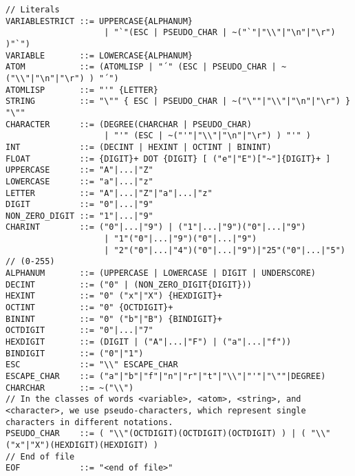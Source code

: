\begin{lstlisting}[label={lst:newOzLexical},language=ebnf]
// Literals
VARIABLESTRICT ::= UPPERCASE{ALPHANUM}
                    | "`"(ESC | PSEUDO_CHAR | ~("`"|"\\"|"\n"|"\r") )"`")
VARIABLE       ::= LOWERCASE{ALPHANUM}
ATOM           ::= (ATOMLISP | "´" (ESC | PSEUDO_CHAR | ~("\\"|"\n"|"\r") ) "´")
ATOMLISP       ::= "'" {LETTER}
STRING         ::= "\"" { ESC | PSEUDO_CHAR | ~("\""|"\\"|"\n"|"\r") } "\""
CHARACTER      ::= (DEGREE(CHARCHAR | PSEUDO_CHAR)
                    | "'" (ESC | ~("'"|"\\"|"\n"|"\r") ) "'" )
INT            ::= (DECINT | HEXINT | OCTINT | BININT)
FLOAT          ::= {DIGIT}+ DOT {DIGIT} [ ("e"|"E")["~"]{DIGIT}+ ]
UPPERCASE      ::= "A"|...|"Z"
LOWERCASE      ::= "a"|...|"z"
LETTER         ::= "A"|...|"Z"|"a"|...|"z"
DIGIT          ::= "0"|...|"9"
NON_ZERO_DIGIT ::= "1"|...|"9"
CHARINT        ::= ("0"|...|"9") | ("1"|...|"9")("0"|...|"9")
                    | "1"("0"|...|"9")("0"|...|"9")
                    | "2"("0"|...|"4")("0"|...|"9")|"25"("0"|...|"5") // (0-255)
ALPHANUM       ::= (UPPERCASE | LOWERCASE | DIGIT | UNDERSCORE)
DECINT         ::= ("0" | (NON_ZERO_DIGIT{DIGIT}))
HEXINT         ::= "0" ("x"|"X") {HEXDIGIT}+
OCTINT         ::= "0" {OCTDIGIT}+
BININT         ::= "0" ("b"|"B") {BINDIGIT}+
OCTDIGIT       ::= "0"|...|"7"
HEXDIGIT       ::= (DIGIT | ("A"|...|"F") | ("a"|...|"f"))
BINDIGIT       ::= ("0"|"1")
ESC            ::= "\\" ESCAPE_CHAR
ESCAPE_CHAR    ::= ("a"|"b"|"f"|"n"|"r"|"t"|"\\"|"'"|"\""|DEGREE)
CHARCHAR       ::= ~("\\")
// In the classes of words <variable>, <atom>, <string>, and <character>, we use pseudo-characters, which represent single characters in different notations.
PSEUDO_CHAR    ::= ( "\\"(OCTDIGIT)(OCTDIGIT)(OCTDIGIT) ) | ( "\\"("x"|"X")(HEXDIGIT)(HEXDIGIT) )
// End of file
EOF            ::= "<end of file>"

\end{lstlisting}
